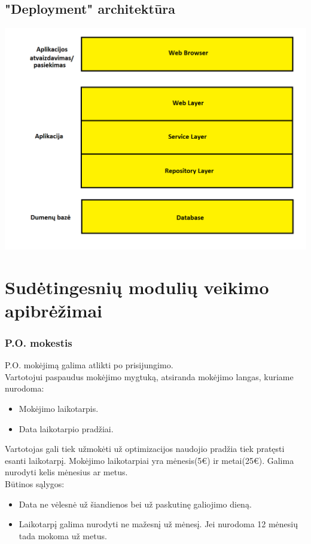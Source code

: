 \documentclass[a4paper,12pt]{article}
\begin{document}
\subsection{"Deployment" architektūra}
\includegraphics[scale=0.5]{architektura3}




\section{Sudėtingesnių modulių veikimo apibrėžimai}

\subsubsection{P.O. mokestis}
P.O. mokėjimą galima atlikti po prisijungimo. \\
Vartotojui paspaudus mokėjimo mygtuką, atsiranda mokėjimo langas, kuriame nurodoma:
\begin{itemize}
	\item Mokėjimo laikotarpis.
	\item Data laikotarpio pradžiai. 
\end{itemize} 

Vartotojas gali tiek užmokėti už optimizacijos naudojio pradžia tiek pratęsti esanti laikotarpį.
Mokėjimo laikotarpiai yra mėnesis(5€) ir metai(25€). Galima nurodyti kelis mėnesius ar metus. \\
Būtinos sąlygos:
\begin{itemize}
	\item Data ne vėlesnė už šiandienos bei už paskutinę galiojimo dieną.
	\item Laikotarpį galima nurodyti ne mažesnį už mėnesį. Jei nurodoma 12 mėnesių tada mokoma už metus.
\end{itemize}
\end{document}
